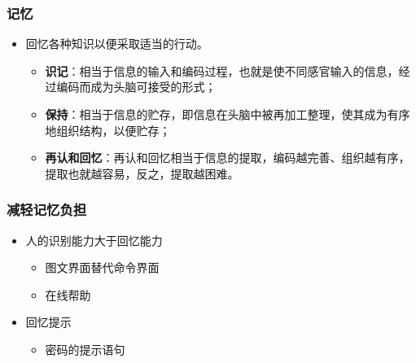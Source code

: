 \documentclass{beamer}
\begin{document}
\begin{frame}
	\frametitle{记忆}
	\beamertemplatetransparentcovereddynamicmedium
	\begin{itemize}
		\item 回忆各种知识以便采取适当的行动。
		\begin{itemize}[<+->]
			\item \textbf{识记}：相当于信息的输入和编码过程{\tiny ，也就是使不同感官输入的信息，经过编码而成为头脑可接受的形式；}
			\item \textbf{保持}：相当于信息的贮存{\tiny ，即信息在头脑中被再加工整理，使其成为有序地组织结构，以便贮存；}
			\item \textbf{再认和回忆}：再认和回忆相当于信息的提取{\tiny ，编码越完善、组织越有序，提取也就越容易，反之，提取越困难。}
		\end{itemize}
	\end{itemize}
\end{frame}

{
\frame[plain]{\transdissolve}
}

\begin{frame}
	\frametitle{减轻记忆负担}
	\beamertemplatetransparentcovereddynamicmedium
	\begin{itemize}
		\item 人的识别能力大于回忆能力
		\begin{itemize}
			\item 图文界面替代命令界面
			\item 在线帮助
		\end{itemize}\pause
		\item 回忆提示
		\begin{itemize}
			\item 密码的提示语句
		\end{itemize}
	\end{itemize}
\end{frame}
\end{document}
